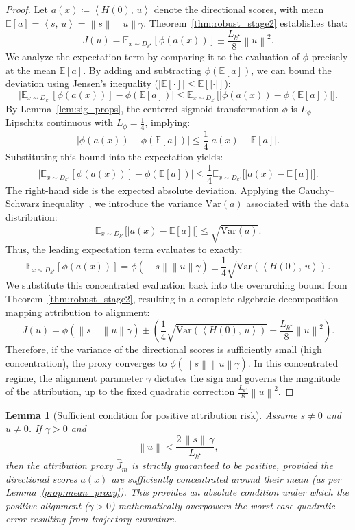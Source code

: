 \documentclass{article}
\theoremstyle{plain}
\newtheorem{lemma}{Lemma}
\theoremstyle{definition}
\theoremstyle{remark}
\numberwithin{theorem}{section}
\numberwithin{definition}{section}
\numberwithin{remark}{section}
\numberwithin{lemma}{section}
\numberwithin{assumption}{section}
\newcommand{\ip}[2]{\left\langle #1,\,#2 \right\rangle}
\newcommand{\norm}[1]{\left\lVert #1 \right\rVert}
\newcommand{\E}{\mathbb{E}}
\newcommand{\tindex}{k^\star}
\newcommand{\utarget}{u}
\begin{document}
\begin{proof}
Let $a(x) \coloneqq \ip{H(0)}{\utarget}$ denote the directional scores, with mean $\E[a] = \ip{s}{\utarget} = \norm{s}\norm{\utarget}\gamma$.
Theorem~\ref{thm:robust_stage2} establishes that:
\[
J(\utarget) = \E_{x\sim D_{\tindex}}[\phi(a(x))] \pm \frac{L_{\tindex}}{8}\norm{\utarget}^2.
\]
We analyze the expectation term by comparing it to the evaluation of $\phi$ precisely at the mean $\E[a]$. 
By adding and subtracting $\phi(\E[a])$, we can bound the deviation using Jensen's inequality ($|\E[\cdot]| \le \E[|\cdot|]$):
\[
\Big|\E_{x\sim D_{\tindex}}[\phi(a(x))] - \phi(\E[a])\Big| \le \E_{x\sim D_{\tindex}}\Big[ \big| \phi(a(x)) - \phi(\E[a]) \big| \Big].
\]
By Lemma~\ref{lem:sig_props}, the centered sigmoid transformation $\phi$ is $L_\phi$-Lipschitz continuous with $L_\phi = \frac{1}{4}$, implying:
\[
\big| \phi(a(x)) - \phi(\E[a]) \big| \le \frac{1}{4} \big| a(x) - \E[a] \big|.
\]
Substituting this bound into the expectation yields:
\[
\Big|\E_{x\sim D_{\tindex}}[\phi(a(x))] - \phi(\E[a])\Big| \le \frac{1}{4} \E_{x\sim D_{\tindex}}\Big[ \big| a(x) - \E[a] \big| \Big].
\]
The right-hand side is the expected absolute deviation. Applying the Cauchy--Schwarz inequality~\cite{steele2004cauchy}, we introduce the variance $\mathrm{Var}(a)$ associated with the data distribution:
\[
\E_{x\sim D_{\tindex}}\Big[ \big| a(x) - \E[a] \big| \Big] \le \sqrt{\mathrm{Var}(a)}.
\]
Thus, the leading expectation term evaluates to exactly:
\[
\E_{x\sim D_{\tindex}}[\phi(a(x))] = \phi(\norm{s}\norm{\utarget}\gamma) \pm \frac{1}{4}\sqrt{\mathrm{Var}(\ip{H(0)}{\utarget})}.
\]
We substitute this concentrated evaluation back into the overarching bound from Theorem~\ref{thm:robust_stage2}, resulting in a complete algebraic decomposition mapping attribution to alignment:
\[
J(\utarget) = \phi(\norm{s}\norm{\utarget}\gamma) \pm \left( \frac{1}{4}\sqrt{\mathrm{Var}(\ip{H(0)}{\utarget})} + \frac{L_{\tindex}}{8}\norm{\utarget}^2 \right).
\]
Therefore, if the variance of the directional scores is sufficiently small (high concentration), the proxy converges to $\phi(\norm{s}\norm{\utarget}\gamma)$. In this concentrated regime, the alignment parameter $\gamma$ dictates the sign and governs the magnitude of the attribution, up to the fixed quadratic correction $\frac{L_{\tindex}}{8}\norm{\utarget}^2$.
\end{proof}

\begin{lemma}[Sufficient condition for positive attribution risk]
\label{lem:gamma_dom}
Assume $s\neq 0$ and $\utarget\neq 0$. If $\gamma>0$ and
\begin{equation}
\label{eq:gamma_dom}
\norm{\utarget} < \frac{2\,\norm{s}\,\gamma}{L_{\tindex}},
\end{equation}
then the attribution proxy $\widehat{J}_m$ is strictly guaranteed to be positive, provided the directional scores $a(x)$ are sufficiently concentrated around their mean (as per Lemma~\ref{prop:mean_proxy}). 
This provides an absolute condition under which the positive alignment ($\gamma>0$) mathematically overpowers the worst-case quadratic error resulting from trajectory curvature.
\end{lemma}
\end{document}
